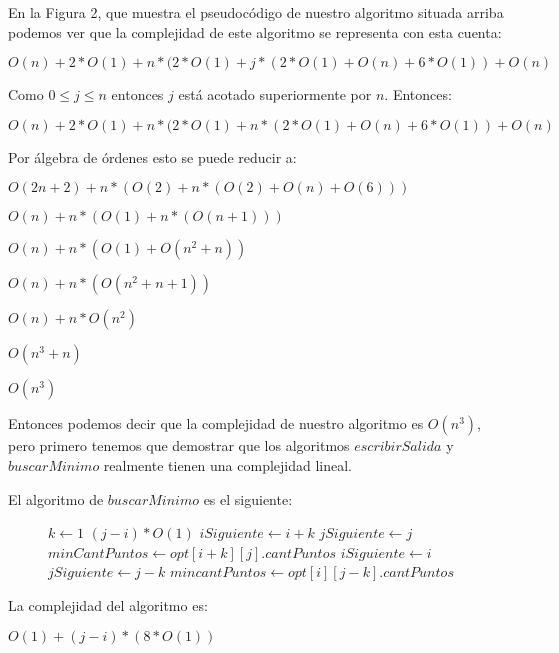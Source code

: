 En la Figura 2, que muestra el pseudocódigo de nuestro algoritmo situada arriba podemos ver que la complejidad de este algoritmo se representa con esta cuenta:

$O(n) + 2*O(1) + n*(2*O(1) + j*(2*O(1) +O(n) + 6*O(1)) + O(n)$

Como $0 \leq j \leq n$ entonces $j$ está acotado superiormente por $n$. Entonces:

$O(n) + 2*O(1) + n*(2*O(1) + n*(2*O(1) +O(n) + 6*O(1)) + O(n)$

Por álgebra de órdenes esto se puede reducir a:

$O(2n+2) + n*(O(2) + n*(O(2) + O(n) + O (6)))$

$O(n) + n*(O(1) + n*(O(n+1)))$

$O(n) + n*(O(1) + O(n^2+n))$

$O(n) + n*(O(n^2 +n +1))$

$O(n) + n*O(n^2)$

$O(n^3+n)$

$O(n^3)$

Entonces podemos decir que la complejidad de nuestro algoritmo es $O(n^3)$, pero primero tenemos que demostrar que los algoritmos $escribirSalida$ y $buscarMinimo$ realmente tienen una complejidad lineal.

El algoritmo de $buscarMinimo$ es el siguiente:

\begin{center}
 \begin{figure}[H]
  \begin{pseudo}
    \State $k \leftarrow 1$
     \hfill $(j-i)*O(1)$
	\State $iSiguiente \leftarrow i+k$
	\State $jSiguiente \leftarrow j$
	\State $minCantPuntos \leftarrow opt[i+k][j].cantPuntos$
      \EndIf
	\State $iSiguiente \leftarrow i$
	\State $jSiguiente \leftarrow j-k$
	\State $mincantPuntos \leftarrow opt[i][j-k].cantPuntos$
      \EndIf
    \EndWhile
   \EndProcedure
  \end{pseudo}

 \end{figure}

\end{center}

La complejidad del algoritmo es:

$O(1) + (j-i)*(8*O(1))$

